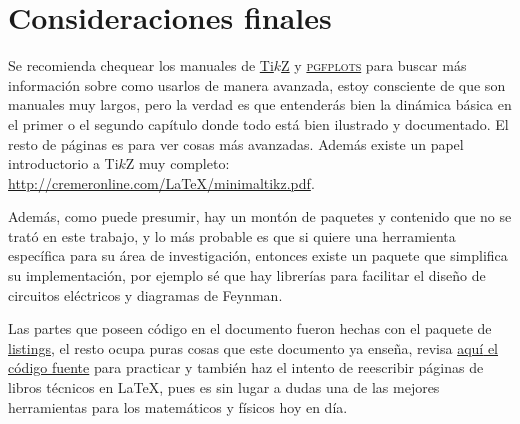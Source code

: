 \section{Consideraciones finales}
Se recomienda chequear los manuales de \href{http://mirrors.ctan.org/graphics/pgf/base/doc/pgfmanual.pdf}{Ti$k$Z} y \href{https://ctan.dcc.uchile.cl/graphics/pgf/contrib/pgfplots/doc/pgfplots.pdf}{\textsc{pgfplots}} para buscar más información sobre como usarlos de manera avanzada, estoy consciente de que son manuales muy largos, pero la verdad es que entenderás bien la dinámica básica en el primer o el segundo capítulo donde todo está bien ilustrado y documentado. El resto de páginas es para ver cosas más avanzadas. Además existe un papel introductorio a Ti$k$Z muy completo: \url{http://cremeronline.com/LaTeX/minimaltikz.pdf}.

Además, como puede presumir, hay un montón de paquetes y contenido que no se trató en este trabajo, y lo más probable es que si quiere una herramienta específica para su área de investigación, entonces existe un paquete que simplifica su implementación, por ejemplo sé que hay librerías para facilitar el diseño de circuitos eléctricos y diagramas de Feynman.

Las partes que poseen código en el documento fueron hechas con el paquete de \href{http://texdoc.net/texmf-dist/doc/latex/listings/listings.pdf}{\ttfamily listings}, el resto ocupa puras cosas que este documento ya enseña, revisa \href{https://github.com/JoseCuevasBtos/apuntes-tex/blob/master/intro-breve-latex.tex}{\textcolor{newblue}{aquí} el código fuente} para practicar y también haz el intento de reescribir páginas de libros técnicos en \LaTeX{}, pues es sin lugar a dudas una de las mejores herramientas para los matemáticos y físicos hoy en día.

